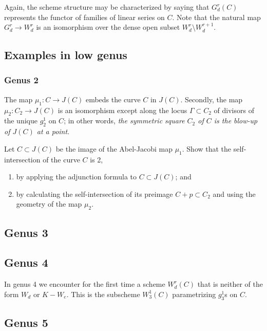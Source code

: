 Again, the scheme structure may be characterized by saying that $G^r_d(C)$ represents the functor of families of linear series on $C$. Note that the natural map $G^r_d \to W^r_d$ is an isomorphism over the dense open subset $W^r_d \setminus W^{r+1}_d$. 



\subsection{Examples in low genus}

\subsubsection{Genus 2} The map $\mu_1 : C \to J(C)$ embeds the curve $C$ in $J(C)$. Secondly, the map $\mu_2 : C_2 \to J(C)$ is an isomorphism except along the locus $\Gamma \subset C_2$ of divisors of the unique $g^1_2$ on $C$; in other words, \emph{the symmetric square $C_2$ of $C$ is the blow-up of $J(C)$ at a point}. 

\begin{exercise}
Let $C \subset J(C)$ be the image of the Abel-Jacobi map $\mu_1$. Show that the self-intersection of the curve $C$ is 2,
\begin{enumerate}
\item by applying the adjunction formula to $C \subset J(C)$; and
\item by calculating the self-intersection of its preimage $C + p \subset C_2$ and using the geometry of the map $\mu_2$.
\end{enumerate}
\end{exercise}

\subsection{Genus 3}


\subsection{Genus 4}

In genus 4 we encounter for the first time a scheme $W^r_d(C)$ that is neither of the form $W_d$ or $K - W_e$. This is the subscheme $W^1_3(C)$ parametrizing $g^1_3$s on $C$.

\subsection{Genus 5}

